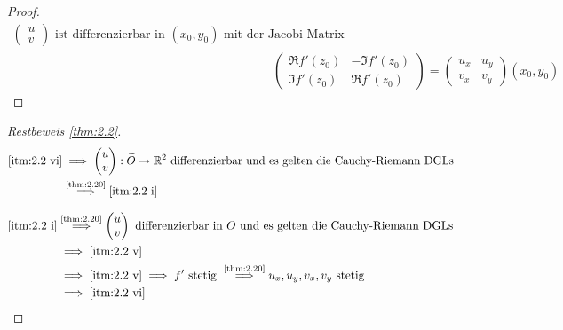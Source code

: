 \begin{theorem}[Satz]
\begin{proof}
\begin{align*}
\begin{pmatrix}
        u \\ v
      \end{pmatrix}
      \text{ ist differenzierbar in } (x_0,y_0) \text{ mit der Jacobi-Matrix} \\
      &\phantom{\iff\quad}
      \begin{pmatrix}
        \Re f'(z_0) & -\Im f'(z_0) \\
        \Im f'(z_0) & \Re f'(z_0)
      \end{pmatrix}
      =
      \begin{pmatrix}
        u_x & u_y \\
        v_x & v_y
      \end{pmatrix}
      (x_0,y_0)
    \end{align*}
  \end{proof}
\end{theorem}

\begin{proof}[Restbeweis \ref{thm:2.2}]
  \begin{align*}
    \ref{itm:2.2 vi}
    &\implies \begin{pmatrix} u \\ v \end{pmatrix} : \widetilde{O} \to \mathbb{R}^2 \text{ differenzierbar und es gelten die Cauchy-Riemann DGLs} \\
    &\overset{\text{\ref{thm:2.20}}}{\implies} \ref{itm:2.2 i}
  \end{align*}
  
  \begin{align*}
    \ref{itm:2.2 i}
    &\overset{\text{\ref{thm:2.20}}}{\implies} \begin{pmatrix} u \\ v \end{pmatrix} \text{ differenzierbar in $O$ und es gelten die Cauchy-Riemann DGLs} \\
    &\implies \ref{itm:2.2 v} \\
    &\implies \ref{itm:2.2 v} \implies f' \text{ stetig } \overset{\text{\ref{thm:2.20}}}{\implies} u_x, u_y, v_x, v_y \text{ stetig} \\
    &\implies \ref{itm:2.2 vi}
  \end{align*}
\end{proof}

